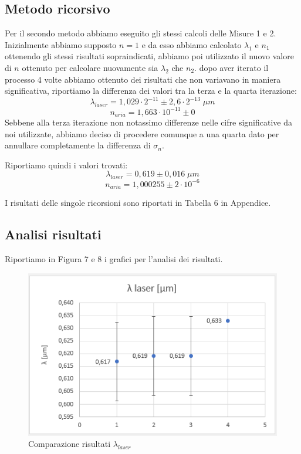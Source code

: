 \documentclass{article}
\begin{document}
\subsection{Metodo ricorsivo}
Per il secondo metodo abbiamo eseguito gli stessi calcoli delle Misure 1 e 2. Inizialmente abbiamo supposto $n = 1$ e da esso abbiamo calcolato $\lambda_1$ e $n_1$ ottenendo gli stessi risultati sopraindicati, abbiamo poi utilizzato il nuovo valore di $n$ ottenuto per calcolare nuovamente sia $\lambda_2$ che $n_2$. dopo aver iterato il processo 4 volte abbiamo ottenuto dei risultati che non variavano in maniera significativa, riportiamo la differenza dei valori tra la terza e la quarta iterazione:
\[ \lambda_{laser} = 1,029 \cdot 2^{-11} \pm 2,6 \cdot 2^{-13} \; \mu m \]
\[ n_{aria} = 1,663 \cdot 10^{-11} \pm 0 \]
Sebbene alla terza iterazione non notassimo differenze nelle cifre significative da noi utilizzate, abbiamo deciso di procedere comunque a una quarta dato per annullare completamente la differenza di $\sigma_n$. 

\vspace{3mm}

Riportiamo quindi i valori trovati:
\[ \lambda_{laser} = 0,619 \pm 0,016 \; \mu m \]
\[ n_{aria} = 1,000255 \pm 2 \cdot 10^{-6} \]

I risultati delle singole ricorsioni sono riportati in Tabella 6 in Appendice.



\subsection{Analisi risultati}
Riportiamo in Figura 7 e 8 i grafici per l'analisi dei risultati.

\begin{figure}[h!]
  \centering
  \includegraphics[width=0.6\linewidth]{IM grafico risultati lambda}
  \caption{Comparazione risultati $\lambda_{laser}$}
\end{figure}
\end{document}
